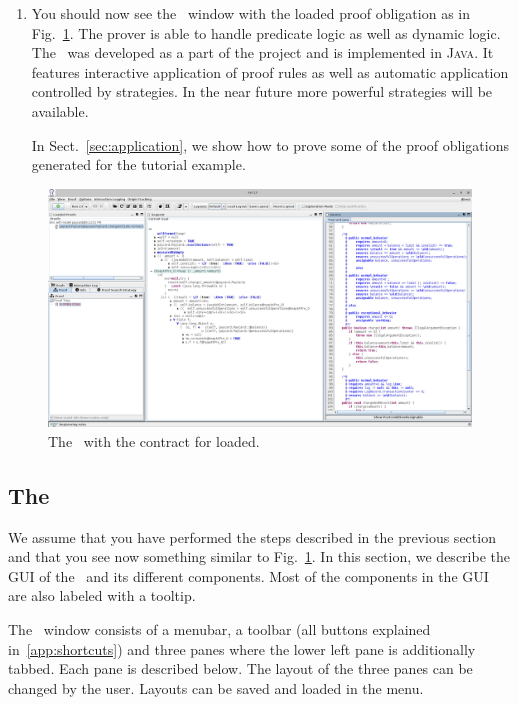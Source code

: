 \begin{enumerate}
\item You should now see the \kp\ window with the loaded proof
  obligation as in Fig.~\ref{fig:proverWithLoadedPO}. The prover is
  able to handle predicate logic as well as dynamic logic. The \kp\
  was developed as a part of the \KeY project and is implemented in
  \textsc{Java}. It features interactive application of proof rules
  as well as automatic application controlled by strategies. In the
  near future more powerful strategies will be available.

  In Sect.~\ref{sec:application}, we show how to prove some of the
  proof obligations generated for the tutorial example.
\end{enumerate}

  \begin{figure}
    \centering
    \includegraphics[width=\textwidth]{../figures/proverWithLoadedPO}
    \caption{The \kp\ with the contract
      for  loaded.}
    \label{fig:proverWithLoadedPO}
  \end{figure}


\subsection{The \kp} 
\label{sec:prover}

We assume that you have performed the steps described in the previous
section and that you see now something similar to
Fig.~\ref{fig:proverWithLoadedPO}. In this section, we describe the GUI
of the \kt\ and its different components. Most of the components in
the GUI are also labeled with a tooltip.


The \kp\ window consists of a menubar, a toolbar (all buttons explained in~\ref{app:shortcuts}) 
and three panes where 
the lower left pane is additionally tabbed. Each pane is described below.
%
The layout of the three panes can be changed by the user. Layouts can be saved and loaded
in the \meb{View}{Layout} menu.

